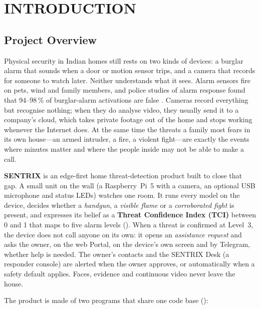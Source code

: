 \chapter{INTRODUCTION}
\label{ch:intro}

\section{Project Overview}
\label{sec:overview}

Physical security in Indian homes still rests on two kinds of devices: a burglar alarm that sounds when a door or motion sensor trips, and a camera that records for someone to watch later. Neither understands what it sees. Alarm sensors fire on pets, wind and family members, and police studies of alarm response found that 94--98\,\% of burglar-alarm activations are false \cite{sampson2011false}. Cameras record everything but recognise nothing; when they do analyse video, they usually send it to a company's cloud, which takes private footage out of the home and stops working whenever the Internet does. At the same time the threats a family most fears in its own house---an armed intruder, a fire, a violent fight---are exactly the events where minutes matter and where the people inside may not be able to make a call.

\textbf{SENTRIX} is an edge-first home threat-detection product built to close that gap. A small unit on the wall (a Raspberry~Pi~5 with a camera, an optional USB microphone and status LEDs) watches one room. It runs every model on the device, decides whether a \emph{handgun}, a \emph{visible flame} or a \emph{corroborated fight} is present, and expresses its belief as a \textbf{Threat Confidence Index (TCI)} between 0 and 1 that maps to five alarm levels (). When a threat is confirmed at Level~3, the device does not call anyone on its own: it opens an \emph{assistance request} and asks the owner, on the web Portal, on the device's own screen and by Telegram, whether help is needed. The owner's contacts and the SENTRIX Desk (a responder console) are alerted when the owner approves, or automatically when a safety default applies. Faces, evidence and continuous video never leave the house.

The product is made of two programs that share one code base ():

